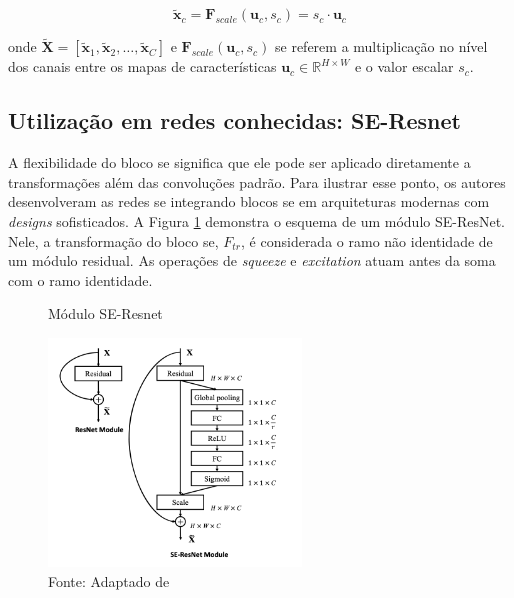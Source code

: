 \begin{equation}
\tilde{\mathbf{x}}_c = \mathbf{F}_{scale}(\mathbf{u}_c, s_c) = s_c \cdot \mathbf{u}_c 
\label{eq:se_scale}
\end{equation}

\noindent onde $\tilde{\mathbf{X}} = [\tilde{\mathbf{x}}_1, \tilde{\mathbf{x}}_2, \dots, \tilde{\mathbf{x}}_C]$ e $\mathbf{F}_{scale}(\mathbf{u}_c, s_c)$ se referem a multiplicação no nível dos canais entre os mapas de características $\mathbf{u}_c \in \mathbb{R}^{H \times W}$ e o valor escalar $s_c$.

\subsection{Utilização em redes conhecidas: SE-Resnet}
\label{subsec:util_resnet}

A flexibilidade do bloco \gls{se} significa que ele pode ser aplicado diretamente a transformações além das convoluções padrão. Para ilustrar esse ponto, os autores desenvolveram as redes \gls{se}  integrando blocos \gls{se} em arquiteturas modernas com \textit{designs} sofisticados. A Figura \ref{fig:fig026} demonstra o esquema de um módulo SE-ResNet. Nele, a transformação do bloco \gls{se}, $F_{tr}$, é considerada o ramo não identidade de um módulo residual. As operações de \textit{squeeze} e \textit{excitation} atuam antes da soma com o ramo identidade.


\begin{figure}[h!]
    \centering
    \caption{Módulo SE-Resnet}
    \includegraphics[width=0.6\textwidth]{figures/fig026.png}
    \caption*{Fonte: Adaptado de \cite{huSqueezeandExcitationNetworks2018}}
    \label{fig:fig026}
\end{figure}

